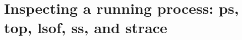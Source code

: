 \chapter{Inspecting a running process: ps, top, lsof, ss, and strace}
\label{ch:inspecting-a-running-process-ps-top}

